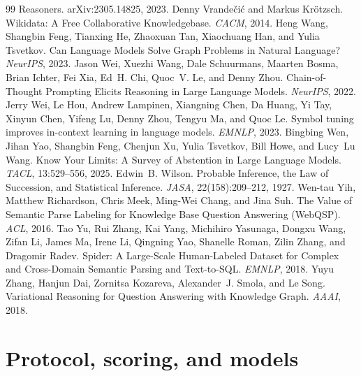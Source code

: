 \documentclass[10pt]{article} %
\begin{document}
\begin{thebibliography}{99}
Reasoners. arXiv:2305.14825, 2023.
Denny Vrande\v{c}i\'c and Markus Kr\"otzsch.
Wikidata: A Free Collaborative Knowledgebase.
\emph{CACM}, 2014.
Heng Wang, Shangbin Feng, Tianxing He, Zhaoxuan Tan, Xiaochuang Han, and
Yulia Tsvetkov.
Can Language Models Solve Graph Problems in Natural Language?
\emph{NeurIPS}, 2023.
Jason Wei, Xuezhi Wang, Dale Schuurmans, Maarten Bosma, Brian Ichter, Fei Xia,
Ed~H. Chi, Quoc~V. Le, and Denny Zhou.
Chain-of-Thought Prompting Elicits Reasoning in Large Language Models.
\emph{NeurIPS}, 2022.
Jerry Wei, Le Hou, Andrew Lampinen, Xiangning Chen, Da Huang, Yi Tay,
Xinyun Chen, Yifeng Lu, Denny Zhou, Tengyu Ma, and Quoc Le.
Symbol tuning improves in-context learning in language models.
\emph{EMNLP}, 2023.
Bingbing Wen, Jihan Yao, Shangbin Feng, Chenjun Xu, Yulia Tsvetkov, Bill Howe,
and Lucy~Lu Wang.
Know Your Limits: A Survey of Abstention in Large Language Models.
\emph{TACL}, 13:529--556, 2025.
Edwin~B. Wilson.
Probable Inference, the Law of Succession, and Statistical Inference.
\emph{JASA}, 22(158):209--212, 1927.
Wen-tau Yih, Matthew Richardson, Chris Meek, Ming-Wei Chang, and Jina Suh.
The Value of Semantic Parse Labeling for Knowledge Base Question Answering
({WebQSP}). \emph{ACL}, 2016.
Tao Yu, Rui Zhang, Kai Yang, Michihiro Yasunaga, Dongxu Wang, Zifan Li,
James Ma, Irene Li, Qingning Yao, Shanelle Roman, Zilin Zhang, and
Dragomir Radev.
Spider: A Large-Scale Human-Labeled Dataset for Complex and Cross-Domain
Semantic Parsing and Text-to-SQL. \emph{EMNLP}, 2018.
Yuyu Zhang, Hanjun Dai, Zornitsa Kozareva, Alexander~J. Smola, and Le Song.
Variational Reasoning for Question Answering with Knowledge Graph.
\emph{AAAI}, 2018.
\end{thebibliography}

\appendix
\FloatBarrier

\section{Protocol, scoring, and models}
\label{app:protocol}
\end{document}
